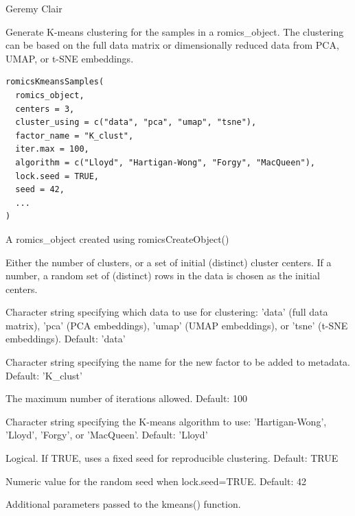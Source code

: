 \documentclass[a4paper]{book}
\begin{document}
%
\begin{Author}
Geremy Clair
\end{Author}
%
\begin{Description}
Generate K-means clustering for the samples in a romics\_object. The clustering can be based on
the full data matrix or dimensionally reduced data from PCA, UMAP, or t-SNE embeddings.
\end{Description}
%
\begin{Usage}
\begin{verbatim}
romicsKmeansSamples(
  romics_object,
  centers = 3,
  cluster_using = c("data", "pca", "umap", "tsne"),
  factor_name = "K_clust",
  iter.max = 100,
  algorithm = c("Lloyd", "Hartigan-Wong", "Forgy", "MacQueen"),
  lock.seed = TRUE,
  seed = 42,
  ...
)
\end{verbatim}
\end{Usage}
%
\begin{Arguments}
\begin{ldescription}
\item[\code{romics\_object}] A romics\_object created using romicsCreateObject()

\item[\code{centers}] Either the number of clusters, or a set of initial (distinct) cluster centers.
If a number, a random set of (distinct) rows in the data is chosen as the initial centers.

\item[\code{cluster\_using}] Character string specifying which data to use for clustering:
'data' (full data matrix), 'pca' (PCA embeddings), 'umap' (UMAP embeddings), or 'tsne' (t-SNE embeddings). Default: 'data'

\item[\code{factor\_name}] Character string specifying the name for the new factor to be added to metadata.
Default: 'K\_clust'

\item[\code{iter.max}] The maximum number of iterations allowed. Default: 100

\item[\code{algorithm}] Character string specifying the K-means algorithm to use:
'Hartigan-Wong', 'Lloyd', 'Forgy', or 'MacQueen'. Default: 'Lloyd'

\item[\code{lock.seed}] Logical. If TRUE, uses a fixed seed for reproducible clustering. Default: TRUE

\item[\code{seed}] Numeric value for the random seed when lock.seed=TRUE. Default: 42

\item[\code{...}] Additional parameters passed to the kmeans() function.
\end{ldescription}
\end{Arguments}
\end{document}
